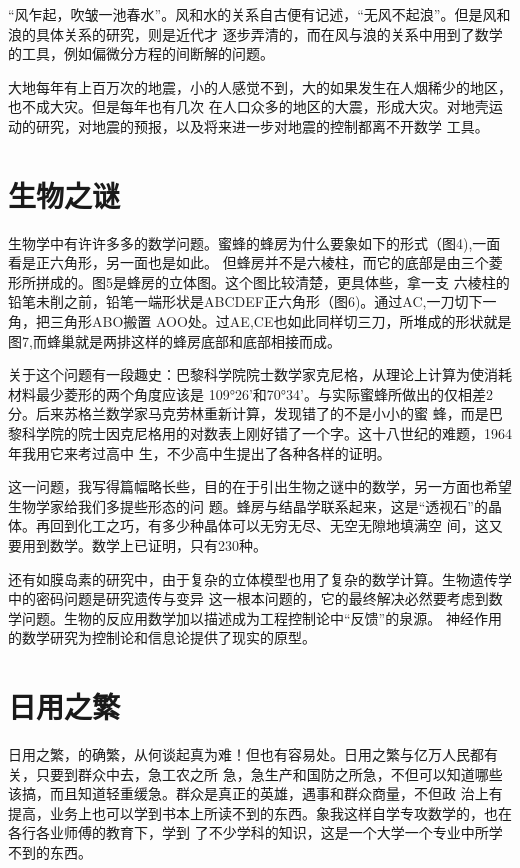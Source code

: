 \documentclass[twoside,openright,headings=optiontohead]{ctexbook} %
\begin{document}
{``风乍起，吹皱一池春水''。风和水的关系自古便有记述，``无风不起浪''。但是风和浪的具体关系的研究，则是近代才
逐步弄清的，而在风与浪的关系中用到了数学的工具，例如偏微分方程的间断解的问题。

大地每年有上百万次的地震，小的人感觉不到，大的如果发生在人烟稀少的地区，也不成大灾。但是每年也有几次
在人口众多的地区的大震，形成大灾。对地壳运动的研究，对地震的预报，以及将来进一步对地震的控制都离不开数学
工具。

\hypertarget{ux751fux7269ux4e4bux8c1c}{%
\section*{生物之谜}\label{ux751fux7269ux4e4bux8c1c}}

生物学中有许许多多的数学问题。蜜蜂的蜂房为什么要象如下的形式（图4),一面看是正六角形，另一面也是如此。
但蜂房并不是六棱柱，而它的底部是由三个菱形所拼成的。图5是蜂房的立体图。这个图比较清楚，更具体些，拿一支
六棱柱的铅笔未削之前，铅笔一端形状是ABCDEF正六角形（图6)。通过AC,一刀切下一角，把三角形ABO搬置
AOO处。过AE,CE也如此同样切三刀，所堆成的形状就是图7,而蜂巢就是两排这样的蜂房底部和底部相接而成。

关于这个问题有一段趣史：巴黎科学院院士数学家克尼格，从理论上计算为使消耗材料最少菱形的两个角度应该是
109°26'和70°34'。与实际蜜蜂所做出的仅相差2分。后来苏格兰数学家马克劳林重新计算，发现错了的不是小小的蜜
蜂，而是巴黎科学院的院士因克尼格用的对数表上刚好错了一个字。这十八世纪的难题，1964年我用它来考过高中
生，不少高中生提出了各种各样的证明。

这一问题，我写得篇幅略长些，目的在于引出生物之谜中的数学，另一方面也希望生物学家给我们多提些形态的问
题。蜂房与结晶学联系起来，这是``透视石''的晶体。再回到化工之巧，有多少种晶体可以无穷无尽、无空无隙地填满空
间，这又要用到数学。数学上已证明，只有230种。

还有如膜岛素的研究中，由于复杂的立体模型也用了复杂的数学计算。生物遗传学中的密码问题是研究遗传与变异
这一根本问题的，它的最终解决必然要考虑到数学问题。生物的反应用数学加以描述成为工程控制论中``反馈''的泉源。
神经作用的数学研究为控制论和信息论提供了现实的原型。

\hypertarget{ux65e5ux7528ux4e4bux7e41}{%
\section*{日用之繁}\label{ux65e5ux7528ux4e4bux7e41}}

日用之繁，的确繁，从何谈起真为难！但也有容易处。日用之繁与亿万人民都有关，只要到群众中去，急工农之所
急，急生产和国防之所急，不但可以知道哪些该搞，而且知道轻重缓急。群众是真正的英雄，遇事和群众商量，不但政
治上有提高，业务上也可以学到书本上所读不到的东西。象我这样自学专攻数学的，也在各行各业师傅的教育下，学到
了不少学科的知识，这是一个大学一个专业中所学不到的东西。

}
\end{document}
